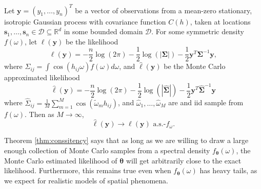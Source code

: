 \begin{theorem}
  \label{thm:conssitency}
	Let $\bm{y} = (y_1, \dots, y_n)^T$ be a vector of observations from a mean-zero stationary, isotropic Gaussian process with covariance function $C(h)$, taken at locations $\bm{s}_1, \dots, \bm{s}_n \in \mathcal{D} \subseteq \mathbb{R}^d$ in some bounded domain $\mathcal{D}$.  For some symmetric density $f(\omega)$, let $\ell(\bm{y})$ be the likelihood
	\[
		\ell(\bm{y}) = -\frac{n}{2} \log(2\pi) - \frac{1}{2} \log(|\bm{\Sigma}|) - \frac{1}{2} \bm{y}^T \bm{\Sigma}^{-1} \bm{y},
	\]
where $\Sigma_{ij} = \int \cos(h_{ij}\omega)f(\omega)d\omega$, and $\hat{\ell}(\bm{y})$ be the Monte Carlo approximated likelihood
   	\[
 		\hat{\ell}(\bm{y}) = -\frac{n}{2} \log(2\pi) - \frac{1}{2} \log (| \widehat{\bm{\Sigma}}|) - \frac{1}{2} \bm{y}^T \widehat{\bm{\Sigma}}^{-1} \bm{y}
	\] 
where $\widehat{\Sigma}_{ij} = \frac{1}{M} \sum_{m=1}^M \cos(\widetilde{\omega}_m h_{ij})$, and $\widehat{\omega}_1, \dots, \widehat{\omega}_M$ are and iid sample from $f(\omega)$.  Then as $M \to \infty$,
\[
\hat{\ell}(\bm{y}) \to \ell(\bm{y}) \text{ a.s.-}f_\omega.
\]

    
\end{theorem}

Theorem \ref{thm:conssitency} says that as long as we are willing to draw a large enough collection of Monte Carlo samples from a spectral density $f_{\bm{\theta}}(\omega)$, the Monte Carlo estimated likelihood of $\bm{\theta}$ will get arbitrarily close to the exact likelihood.  Furthermore, this remains true even when $f_{\bm{\theta}}(\omega)$ has heavy tails, as we expect for realistic models of spatial phenomena.




